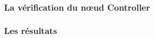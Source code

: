   \begin{frame}
   \frametitle{La vérification du n\oe{}ud Controller}
   
    
   
  \end{frame}

  \begin{frame}
   \frametitle{Les résultats}
   
   
   
   
  \end{frame}

